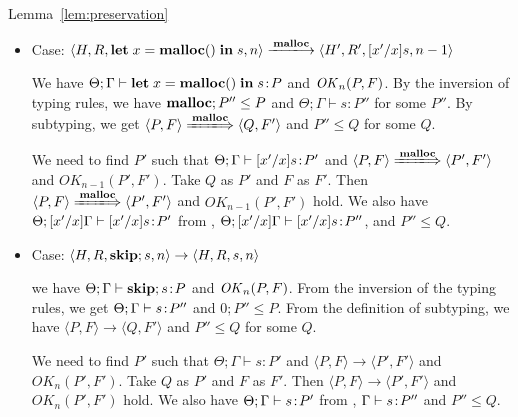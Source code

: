 \begin{pfof}{Lemma~\ref{lem:preservation}}
\begin{itemize}
   We have \(\OK_n(P, F)\) and \(\Theta; \Gamma \vdash \Free(x) \COL
   P\).  From inversion of the typing rules, we have \(\Theta; \Gamma
   \vdash \Free(x) \COL \Free\) and \(\Free \le P\). From the
   definition of subtyping, we have \(\TSKIP \le Q \) and \( \langle
   P, F \rangle \xLongrightarrow{\Free} \langle Q, F' \rangle\) for
   some \(Q\).

   We need to find \(P'\) such that \( \langle P, F \rangle
   \xLongrightarrow{\Free} \langle P', F' \rangle \), \(\Theta; \Gamma
   \vdash \SKIP \COL P'\), and \(\OK_{n+1}(P', F')\).  Take \(Q\) as
   \(P'\) and \(F\) as \(F'\).  Then, \( \langle P, F \rangle
   \xLongrightarrow{\Free} \langle P', F' \rangle \) and
   \(OK_{n+1}(P', F')\) hold.  We also have \(\Theta; \Gamma
   \vdash \SKIP \COL P'\) from , \(\TSKIP \le Q\).

\item Case: \( \langle H, R, \LET x = \MALLOC \IN s, n \rangle
  \xlongrightarrow{\Malloc} \langle H', R', [x'/x]s, n - 1 \rangle \)

  We have \(\Theta; \Gamma \vdash \mathbf{let}\; x = \mathbf{malloc()}\; \mathbf{in}\; s \!:\! P\) and
  \(\mathit{OK}_{n}(P, F)\). By the inversion of typing rules, we have
  \(\mathbf{malloc};P'' \le P\) and \(\Theta; \Gamma \vdash s : P'' \) for
  some \(P''\). By subtyping, we get \( \langle P, F \rangle
  \xLongrightarrow{\Malloc} \langle Q, F' \rangle \) and \( P'' \le
  Q\) for some \(Q\).

  We need to find \(P'\) such that \(\Theta; \Gamma \vdash [x'/x]s\!:\!
  P'\) and \( \langle P, F \rangle \xLongrightarrow{\Malloc} \langle
  P', F' \rangle\) and \(OK_{n-1}(P', F')\). Take \(Q\) as \(P'\) and
  \(F\) as \(F'\).  Then \( \langle P, F \rangle
  \xLongrightarrow{\Malloc} \langle P', F' \rangle\) and \(OK_{n-1}(P', F')\)
  hold. We also have \(\Theta;[x'/x]\Gamma \vdash [x'/x]s \!:\! P'\)
  from , \(\Theta;[x'/x]\Gamma \vdash [x'/x]s \!:\! P''\),
  and \(P'' \le Q\).
      
\item Case: \( \langle H, R, \mathbf{skip};s, n \rangle \rightarrow \langle
  H, R, s, n \rangle \)

  we have \(\Theta;\Gamma \vdash \mathbf{skip};s\!:\! P\) and \(\mathit{OK}_{n}(P,
  F)\). From the inversion of the typing rules, we get \(\Theta;
  \Gamma \vdash s\!:\! P''\) and \(0;P'' \le P\). From the definition
  of subtyping, we have \( \langle P, F \rangle \rightarrow \langle Q, F'
  \rangle\) and \(P'' \le Q\) for some \(Q\).

  We need to find \(P'\) such that \(\Theta; \Gamma \vdash s : P'\)
  and \(\langle P, F \rangle \rightarrow \langle P', F' \rangle\)
  and \(OK_n(P', F')\). Take \(Q\) as \(P'\) and \(F\) as \(F'\). Then
  \(\langle P, F\rangle \rightarrow \langle P', F' \rangle\) and
  \(OK_n(P', F')\) hold. We also have \(\Theta;\Gamma \vdash s\!:\!
  P'\) from , \(\Gamma \vdash s\!:\! P''\) and \(P'' \le Q\).


\end{itemize}
\end{pfof}
